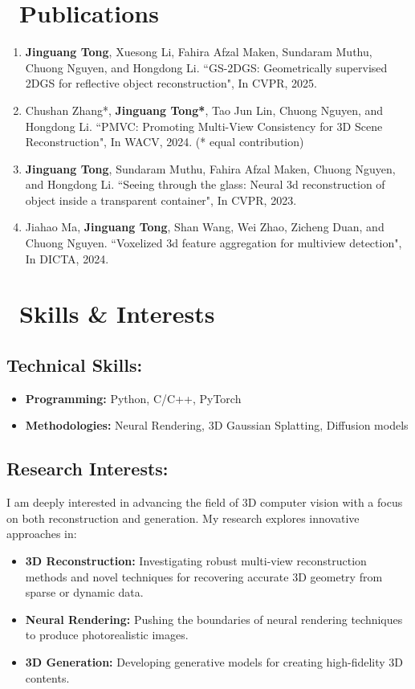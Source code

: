 \documentclass{resume}
\begin{document}
\section{\faBookmark~Publications}
\begin{enumerate}
    \item \textbf{Jinguang Tong}, Xuesong Li, Fahira Afzal Maken, Sundaram Muthu, Chuong Nguyen, and Hongdong Li. ``GS-2DGS: Geometrically supervised 2DGS for reflective object reconstruction", In CVPR, 2025.
    \item Chushan Zhang*, \textbf{Jinguang Tong*}, Tao Jun Lin, Chuong Nguyen, and Hongdong Li. ``PMVC: Promoting Multi-View Consistency for 3D Scene Reconstruction", In WACV, 2024. (* equal contribution) 
    \item \textbf{Jinguang Tong}, Sundaram Muthu, Fahira Afzal Maken, Chuong Nguyen, and Hongdong Li. ``Seeing through the glass: Neural 3d reconstruction of object inside a transparent container", In CVPR, 2023.
    \item Jiahao Ma, \textbf{Jinguang Tong}, Shan Wang, Wei Zhao, Zicheng Duan, and Chuong Nguyen. ``Voxelized 3d feature aggregation for multiview detection", In DICTA, 2024.
\end{enumerate}

\section{\faCogs\ Skills \& Interests}
\subsection*{Technical Skills:}
\begin{itemize}[parsep=0.5ex]
  \item \textbf{Programming:} Python, C/C++, PyTorch
  \item \textbf{Methodologies:} Neural Rendering, 3D Gaussian Splatting, Diffusion models
\end{itemize}

\subsection*{Research Interests:}
I am deeply interested in advancing the field of 3D computer vision with a focus on both reconstruction and generation. My research explores innovative approaches in:
\begin{itemize}[noitemsep]
  \item \textbf{3D Reconstruction:} Investigating robust multi-view reconstruction methods and novel techniques for recovering accurate 3D geometry from sparse or dynamic data.
  \item \textbf{Neural Rendering:} Pushing the boundaries of neural rendering techniques to produce photorealistic images.
  \item \textbf{3D Generation:} Developing generative models for creating high-fidelity 3D contents.
\end{itemize}
\end{document}
